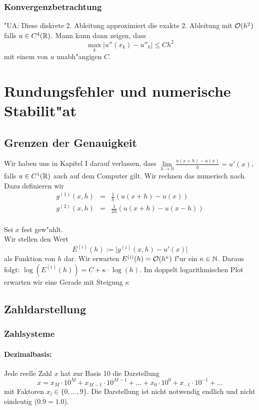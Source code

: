 \documentclass{scrartcl}
\begin{document}
\subsubsection{Konvergenzbetrachtung}
"UA: Diese diskrete 2. Ableitung approximiert die exakte 2. Ableitung mit $\mathcal{O} (h^2)$ falls $u \in C^4(\mathbb{R})$. Mann kann dann zeigen, dass
$$ \max\limits_{k} \vert u''(x_k) - u''_k \vert \leq C h^2$$
mit einem von $u$ unabh"angigen $C$.

\section{Rundungsfehler und numerische Stabilit"at}

\subsection{Grenzen der Genauigkeit}

Wir haben uns in Kapitel I darauf verlassen, dass $\lim\limits_{h \rightarrow 0} \frac{u(x + h) - u(x)}{h} = u'(x)$, falls $u \in C^1(\mathbb{R})$ auch auf dem Computer gilt. Wir rechnen das numerisch nach. Dazu definieren wir 
\begin{eqnarray*}
g^{(1)}(x,h) & = & \frac{1}{h} \left( u(x+h) - u(x) \right)\\
g^{(2)}(x,h) & = & \frac{1}{2h} \left( u(x+h) - u(x-h) \right)
\end{eqnarray*} \\
 Sei $x$ fest gew"ahlt. \\ Wir stellen den Wert
$$ E^{(i)} (h) := \vert g^{(i)} (x,h) - u'(x) \vert $$
als Funktion von $h$ dar. Wir erwarten $E^{(i)} (h) = \mathcal{O} (h^{\kappa})$ f"ur ein $\kappa \in \mathbb{N}$. Daraus folgt: $\log(E^{(i )} (h) ) = C + \kappa \cdot \log(h)$. Im doppelt logarithmischen Plot erwarten wir eine Gerade mit Steigung $\kappa$

\subsection{Zahldarstellung}

\subsubsection{Zahlsysteme}

\paragraph*{Dezimalbasis:} Jede reelle Zahl $x$ hat zur Basis 10 die Darstellung 
$$ x = x_M \cdot 10^M + x_{M-1}\cdot 10^{M-1} + \ldots + x_0 \cdot 10^0 + x_{-1} \cdot  10^{-1} + \ldots $$
mit Faktoren $x_l \in \{ 0, \ldots, 9 \}$. Die Darstellung ist nicht notwendig endlich und nicht eindeutig ($0.\overline{9} = 1.0$).
\end{document}
